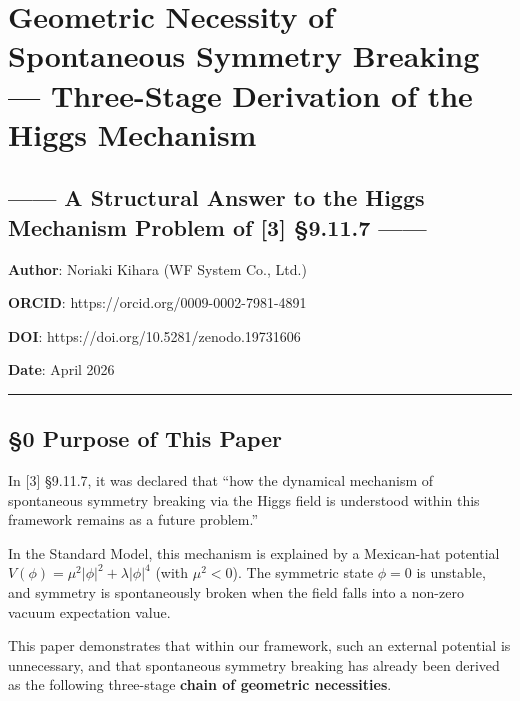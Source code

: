 \documentclass[
  a4paper,11pt]{article}
\author{}
\date{}
\begin{document}
\section{Geometric Necessity of Spontaneous Symmetry Breaking ---
Three-Stage Derivation of the Higgs
Mechanism}\label{geometric-necessity-of-spontaneous-symmetry-breaking-three-stage-derivation-of-the-higgs-mechanism}

\subsection{------ A Structural Answer to the Higgs Mechanism Problem of
{[}3{]} §9.11.7
------}\label{a-structural-answer-to-the-higgs-mechanism-problem-of-3-9.11.7}

\textbf{Author}: Noriaki Kihara (WF System Co., Ltd.)

\textbf{ORCID}: https://orcid.org/0009-0002-7981-4891

\textbf{DOI}: https://doi.org/10.5281/zenodo.19731606

\textbf{Date}: April 2026

\begin{center}\rule{0.5\linewidth}{0.5pt}\end{center}

\subsection{§0 Purpose of This Paper}\label{purpose-of-this-paper}

In {[}3{]} §9.11.7, it was declared that ``how the dynamical mechanism
of spontaneous symmetry breaking via the Higgs field is understood
within this framework remains as a future problem.''

In the Standard Model, this mechanism is explained by a Mexican-hat
potential \(V(\phi) = \mu^2 |\phi|^2 + \lambda |\phi|^4\) (with
\(\mu^2 < 0\)). The symmetric state \(\phi = 0\) is unstable, and
symmetry is spontaneously broken when the field falls into a non-zero
vacuum expectation value.

This paper demonstrates that within our framework, such an external
potential is unnecessary, and that spontaneous symmetry breaking has
already been derived as the following three-stage \textbf{chain of
geometric necessities}.
\end{document}
